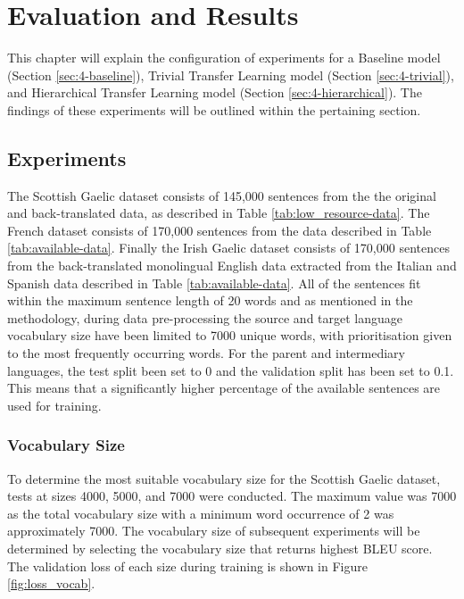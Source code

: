 
\chapter{Evaluation and Results}
This chapter will explain the configuration of experiments for a Baseline model (Section \ref{sec:4-baseline}), Trivial Transfer Learning model (Section \ref{sec:4-trivial}), and Hierarchical Transfer Learning model (Section \ref{sec:4-hierarchical}). The findings of these experiments will be outlined within the pertaining section.
\newpage

\section{Experiments}

The Scottish Gaelic dataset consists of 145,000 sentences from the the original and back-translated data, as described in Table \ref{tab:low_resource-data}. The French dataset consists of 170,000 sentences from the data described in Table \ref{tab:available-data}. Finally the Irish Gaelic dataset consists of 170,000 sentences from the back-translated monolingual English data extracted from the Italian and Spanish data described in Table \ref{tab:available-data}.
All of the sentences fit within the maximum sentence length of 20 words and as mentioned in the methodology, during data pre-processing the source and target language vocabulary size have been limited to 7000 unique words, with prioritisation given to the most frequently occurring words. For the parent and intermediary languages, the test split been set to 0 and the validation split has been set to 0.1. This means that a significantly higher percentage of the available sentences are used for training.

\subsection{Vocabulary Size}
\label{sec:4-vocab_size}

To determine the most suitable vocabulary size for the Scottish Gaelic dataset, tests at sizes 4000, 5000, and 7000 were conducted. The maximum value was 7000 as the total vocabulary size with a minimum word occurrence of 2 was approximately 7000.
The vocabulary size of subsequent experiments will be determined by selecting the vocabulary size that returns highest \acrshort{BLEU} score. The validation loss of each size during training is shown in Figure \ref{fig:loss_vocab}.

